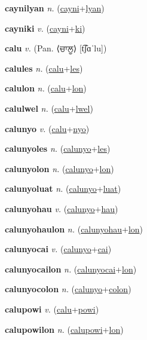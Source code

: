 \textbf{\hypertarget{caynilyan}{caynilyan}} \textit{n.} (\hyperlink{cayni}{cayni}+\allowbreak \hyperlink{lyan}{lyan})


\textbf{\hypertarget{cayniki}{cayniki}} \textit{v.} (\hyperlink{cayni}{cayni}+\allowbreak \hyperlink{ki}{ki})


\textbf{\hypertarget{calu}{calu}} \textit{v.} (Pan. ⟨{\gurmukhi{}ਚਾਲੂ}⟩ [t͡ʃɑˈlu])


\textbf{\hypertarget{calules}{calules}} \textit{n.} (\hyperlink{calu}{calu}+\allowbreak \hyperlink{les}{les})


\textbf{\hypertarget{calulon}{calulon}} \textit{n.} (\hyperlink{calu}{calu}+\allowbreak \hyperlink{lon}{lon})


\textbf{\hypertarget{calulwel}{calulwel}} \textit{n.} (\hyperlink{calu}{calu}+\allowbreak \hyperlink{lwel}{lwel})


\textbf{\hypertarget{calunyo}{calunyo}} \textit{v.} (\hyperlink{calu}{calu}+\allowbreak \hyperlink{nyo}{nyo})


\textbf{\hypertarget{calunyoles}{calunyoles}} \textit{n.} (\hyperlink{calunyo}{calunyo}+\allowbreak \hyperlink{les}{les})


\textbf{\hypertarget{calunyolon}{calunyolon}} \textit{n.} (\hyperlink{calunyo}{calunyo}+\allowbreak \hyperlink{lon}{lon})


\textbf{\hypertarget{calunyoluat}{calunyoluat}} \textit{n.} (\hyperlink{calunyo}{calunyo}+\allowbreak \hyperlink{luat}{luat})


\textbf{\hypertarget{calunyohau}{calunyohau}} \textit{v.} (\hyperlink{calunyo}{calunyo}+\allowbreak \hyperlink{hau}{hau})


\textbf{\hypertarget{calunyohaulon}{calunyohaulon}} \textit{n.} (\hyperlink{calunyohau}{calunyohau}+\allowbreak \hyperlink{lon}{lon})


\textbf{\hypertarget{calunyocai}{calunyocai}} \textit{v.} (\hyperlink{calunyo}{calunyo}+\allowbreak \hyperlink{cai}{cai})


\textbf{\hypertarget{calunyocailon}{calunyocailon}} \textit{n.} (\hyperlink{calunyocai}{calunyocai}+\allowbreak \hyperlink{lon}{lon})


\textbf{\hypertarget{calunyocolon}{calunyocolon}} \textit{n.} (\hyperlink{calunyo}{calunyo}+\allowbreak \hyperlink{colon}{colon})


\textbf{\hypertarget{calupowi}{calupowi}} \textit{v.} (\hyperlink{calu}{calu}+\allowbreak \hyperlink{powi}{powi})


\textbf{\hypertarget{calupowilon}{calupowilon}} \textit{n.} (\hyperlink{calupowi}{calupowi}+\allowbreak \hyperlink{lon}{lon})


